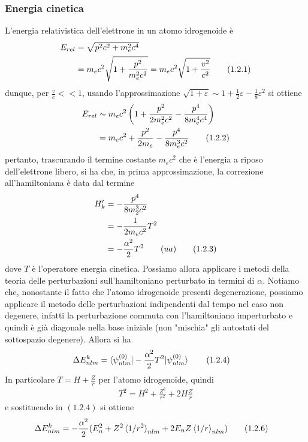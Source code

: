 \documentclass{article}
\begin{document}
\subsubsection*{Energia cinetica}
L'energia relativistica dell'elettrone in un atomo idrogenoide è
\begin{align}
    E_{rel} &= \sqrt{p^2c^2 + m^2_ec^4} \notag \\
    &= m_ec^2\sqrt{1 + \frac{p^2}{m^2_ec^2}} = m_ec^2\sqrt{1 + \frac{v^2}{c^2}} \tag{1.2.1}
\end{align}
dunque, per $\frac{v}{c} << 1$, usando l'approssimazione $\sqrt{1 + \varepsilon} \sim 1 + \frac{1}{2}\varepsilon - \frac{1}{8}\varepsilon^2$ si ottiene
\begin{align}
    E_{rel} &\sim m_ec^2\left(1 + \frac{p^2}{2m^2_ec^2} - \frac{p^4}{8m^4_ec^4}\right) \notag \\
    &= m_ec^2 + \frac{p^2}{2m_e} - \frac{p^4}{8m^3_ec^2} \tag{1.2.2}
\end{align}
pertanto, trascurando il termine costante $m_ec^2$ che è l'energia a riposo dell'elettrone libero, si ha che, in prima approssimazione, la correzione all'hamiltoniana è data dal termine
\begin{align}
    H'_{k} &= -\frac{p^4}{8m^3_2c^2} \notag \\
    &= -\frac{1}{2m_ec^2}T^2 \notag \\
    &= -\frac{\alpha^2}{2}T^2 \qquad (ua) \tag{1.2.3}
\end{align}
dove $T$ è l'operatore energia cinetica. Possiamo allora applicare i metodi della teoria delle perturbazioni sull'hamiltoniano perturbato in termini di $\alpha$. Notiamo che, nonostante il fatto che l'atomo idrogenoide presenti degenerazione, possiamo applicare il metodo delle perturbazioni indipendenti dal tempo nel caso non degenere, infatti la perturbazione commuta con l'hamiltoniano imperturbato e quindi è già diagonale nella base iniziale (non "mischia" gli autostati del sottospazio degenere). Allora si ha
\begin{align}
    \Delta E^k_{nlm} &= \braket{\psi^{(0)}_{nlm}|-\frac{\alpha^2}{2}T^2|\psi^{(0)}_{nlm}} \tag{1.2.4}
\end{align}
In particolare $T = H + \frac{Z}{r}$ per l'atomo idrogenoide, quindi
\begin{align}
    T^2 = H^2 + \frac{Z^2}{r^2} + 2H\frac{Z}{r} \tag{1.2.5}
\end{align}
e sostituendo in $(1.2.4)$ si ottiene
\begin{align}
    \Delta E^k_{nlm} &= -\frac{\alpha^2}{2}(E^2_n + Z^2\braket{1/r^2}_{nlm} + 2E_nZ\braket{1/r}_{nlm}) \tag{1.2.6}
\end{align}
\end{document}
